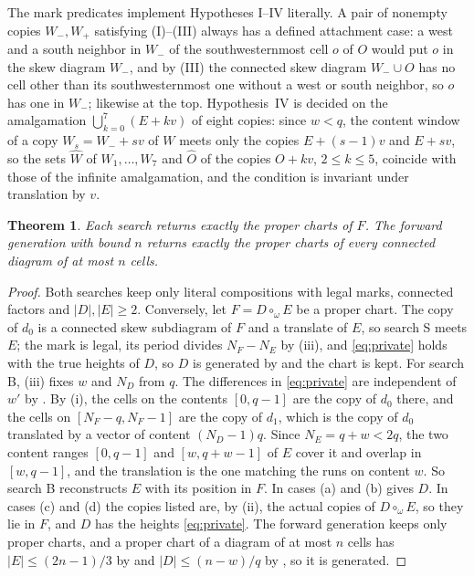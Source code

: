 \documentclass[11pt,a4paper]{amsart}
\numberwithin{equation}{section}
\theoremstyle{plain}
\newtheorem{theorem}{Theorem}[section]
\theoremstyle{definition}
\begin{document}
The mark predicates implement Hypotheses I--IV literally.  A pair of nonempty copies \(W_-,W_+\) satisfying (I)--(III) always has a defined attachment case: a west and a south neighbor in \(W_-\) of the southwesternmost cell \(o\) of \(O\) would put \(o\) in the skew diagram \(W_-\), and by (III) the connected skew diagram \(W_-\cup O\) has no cell other than its southwesternmost one without a west or south neighbor, so \(o\) has one in \(W_-\); likewise at the top.  Hypothesis~IV is decided on the amalgamation \(\bigcup_{k=0}^{7}(E+kv)\) of eight copies: since \(w<q\), the content window of a copy \(W_s=W_-+sv\) of \(W\) meets only the copies \(E+(s-1)v\) and \(E+sv\), so the sets \(\widehat W\) of \(W_1,\ldots,W_7\) and \(\widehat O\) of the copies \(O+kv\), \(2\le k\le5\), coincide with those of the infinite amalgamation, and the condition is invariant under translation by \(v\).

\begin{theorem}\label{thm:searches}
Each search returns exactly the proper charts of \(F\).  The forward generation with bound \(n\) returns exactly the proper charts of every connected diagram of at most \(n\) cells.
\end{theorem}

\begin{proof}
Both searches keep only literal compositions with legal marks, connected factors and \(|D|,|E|\ge2\).  Conversely, let \(F=D\circ_\omega E\) be a proper chart.  The copy of \(d_0\) is a connected skew subdiagram of \(F\) and a translate of \(E\), so search S meets \(E\); the mark is legal, its period divides \(N_F-N_E\) by (iii), and \eqref{eq:private} holds with the true heights of \(D\), so \(D\) is generated by  and the chart is kept.  For search B, (iii) fixes \(w\) and \(N_D\) from \(q\).  The differences in \eqref{eq:private} are independent of \(w'\) by .  By (i), the cells on the contents \([0,q-1]\) are the copy of \(d_0\) there, and the cells on \([N_F-q,N_F-1]\) are the copy of \(d_1\), which is the copy of \(d_0\) translated by a vector of content \((N_D-1)q\).  Since \(N_E=q+w<2q\), the two content ranges \([0,q-1]\) and \([w,q+w-1]\) of \(E\) cover it and overlap in \([w,q-1]\), and the translation is the one matching the runs on content \(w\).  So search B reconstructs \(E\) with its position in \(F\).  In cases (a) and (b)  gives \(D\).  In cases (c) and (d) the copies listed are, by (ii), the actual copies of \(D\circ_\omega E\), so they lie in \(F\), and \(D\) has the heights \eqref{eq:private}.  The forward generation keeps only proper charts, and a proper chart of a diagram of at most \(n\) cells has \(|E|\le(2n-1)/3\) by  and \(|D|\le(n-w)/q\) by , so it is generated.
\end{proof}
\end{document}
